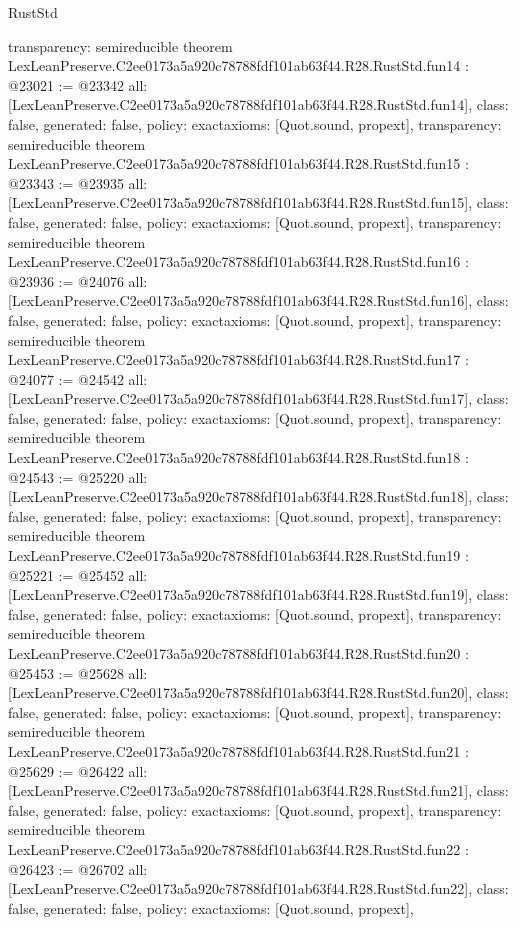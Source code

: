 \begin{lexlean}{RustStd}
\begin{coremodule}
{  transparency: semireducible
}
theorem LexLeanPreserve.C2ee0173a5a920c78788fdf101ab63f44.R28.RustStd.fun14 : @23021 := @23342 {
  all: [LexLeanPreserve.C2ee0173a5a920c78788fdf101ab63f44.R28.RustStd.fun14],
  class: false,
  generated: false,
  policy: exact{axioms: [Quot.sound, propext]},
  transparency: semireducible
}
theorem LexLeanPreserve.C2ee0173a5a920c78788fdf101ab63f44.R28.RustStd.fun15 : @23343 := @23935 {
  all: [LexLeanPreserve.C2ee0173a5a920c78788fdf101ab63f44.R28.RustStd.fun15],
  class: false,
  generated: false,
  policy: exact{axioms: [Quot.sound, propext]},
  transparency: semireducible
}
theorem LexLeanPreserve.C2ee0173a5a920c78788fdf101ab63f44.R28.RustStd.fun16 : @23936 := @24076 {
  all: [LexLeanPreserve.C2ee0173a5a920c78788fdf101ab63f44.R28.RustStd.fun16],
  class: false,
  generated: false,
  policy: exact{axioms: [Quot.sound, propext]},
  transparency: semireducible
}
theorem LexLeanPreserve.C2ee0173a5a920c78788fdf101ab63f44.R28.RustStd.fun17 : @24077 := @24542 {
  all: [LexLeanPreserve.C2ee0173a5a920c78788fdf101ab63f44.R28.RustStd.fun17],
  class: false,
  generated: false,
  policy: exact{axioms: [Quot.sound, propext]},
  transparency: semireducible
}
theorem LexLeanPreserve.C2ee0173a5a920c78788fdf101ab63f44.R28.RustStd.fun18 : @24543 := @25220 {
  all: [LexLeanPreserve.C2ee0173a5a920c78788fdf101ab63f44.R28.RustStd.fun18],
  class: false,
  generated: false,
  policy: exact{axioms: [Quot.sound, propext]},
  transparency: semireducible
}
theorem LexLeanPreserve.C2ee0173a5a920c78788fdf101ab63f44.R28.RustStd.fun19 : @25221 := @25452 {
  all: [LexLeanPreserve.C2ee0173a5a920c78788fdf101ab63f44.R28.RustStd.fun19],
  class: false,
  generated: false,
  policy: exact{axioms: [Quot.sound, propext]},
  transparency: semireducible
}
theorem LexLeanPreserve.C2ee0173a5a920c78788fdf101ab63f44.R28.RustStd.fun20 : @25453 := @25628 {
  all: [LexLeanPreserve.C2ee0173a5a920c78788fdf101ab63f44.R28.RustStd.fun20],
  class: false,
  generated: false,
  policy: exact{axioms: [Quot.sound, propext]},
  transparency: semireducible
}
theorem LexLeanPreserve.C2ee0173a5a920c78788fdf101ab63f44.R28.RustStd.fun21 : @25629 := @26422 {
  all: [LexLeanPreserve.C2ee0173a5a920c78788fdf101ab63f44.R28.RustStd.fun21],
  class: false,
  generated: false,
  policy: exact{axioms: [Quot.sound, propext]},
  transparency: semireducible
}
theorem LexLeanPreserve.C2ee0173a5a920c78788fdf101ab63f44.R28.RustStd.fun22 : @26423 := @26702 {
  all: [LexLeanPreserve.C2ee0173a5a920c78788fdf101ab63f44.R28.RustStd.fun22],
  class: false,
  generated: false,
  policy: exact{axioms: [Quot.sound, propext]},
}
\end{coremodule}
\end{lexlean}
